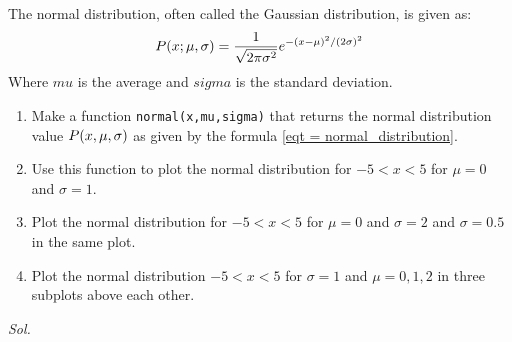     \begin{problem}\label{problem_2.5}
        The normal distribution, often called the Gaussian distribution, is given as:
        \begin{equation} \label{eqt = normal_distribution}
            P\qty(x;\mu,\sigma) = \frac{1}{\sqrt{2\pi\sigma^{2}}} e^{-\qty(x-\mu)^{2} / \qty(2\sigma)^2}
        \end{equation}
        Where $mu$ is the average and $sigma$ is the standard deviation.
        \begin{enumerate}
            \item Make a function \verb|normal(x,mu,sigma)| that returns the normal distribution value $P\qty(x,\mu,\sigma)$ as given by the formula \ref{eqt = normal_distribution}.
            \item Use this function to plot the normal distribution for $-5<x<5$ for $\mu=0$ and $\sigma=1$.
            \item Plot the normal distribution for $-5<x<5$ for $\mu=0$ and $\sigma=2$ and $\sigma=0.5$ in the same plot.
            \item Plot the normal distribution $-5<x<5$ for $\sigma=1$ and $\mu=0,1,2$ in three subplots above each other.
        \end{enumerate}
    \end{problem}
    \textit{ Sol. }
    
